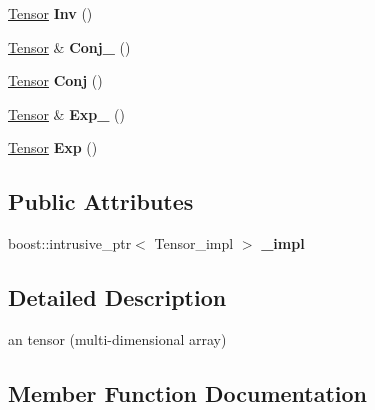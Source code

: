 \begin{DoxyCompactItemize}
\item 
\mbox{\label{classcytnx_1_1Tensor_a7ed6193e29219ff1a2ca2ca95b8b5969}} 
\hyperlink{classcytnx_1_1Tensor}{Tensor} {\bfseries Inv} ()
\item 
\mbox{\label{classcytnx_1_1Tensor_a9312d8faf3fdc8ffe5a7687f88986a1e}} 
\hyperlink{classcytnx_1_1Tensor}{Tensor} \& {\bfseries Conj\+\_\+} ()
\item 
\mbox{\label{classcytnx_1_1Tensor_acf65f5c4d143eb165f7161e58a06b7e4}} 
\hyperlink{classcytnx_1_1Tensor}{Tensor} {\bfseries Conj} ()
\item 
\mbox{\label{classcytnx_1_1Tensor_a4ebfd2713960db958ddb23c4e06c17c4}} 
\hyperlink{classcytnx_1_1Tensor}{Tensor} \& {\bfseries Exp\+\_\+} ()
\item 
\mbox{\label{classcytnx_1_1Tensor_aca1b7e9ae53b3529a7f79b24991c9373}} 
\hyperlink{classcytnx_1_1Tensor}{Tensor} {\bfseries Exp} ()
\end{DoxyCompactItemize}
\subsection*{Public Attributes}
\begin{DoxyCompactItemize}
\item 
\mbox{\label{classcytnx_1_1Tensor_a8ce244b54f83542eb4c66e2d6f0e7d86}} 
boost\+::intrusive\+\_\+ptr$<$ Tensor\+\_\+impl $>$ {\bfseries \+\_\+impl}
\end{DoxyCompactItemize}


\subsection{Detailed Description}
an tensor (multi-\/dimensional array) 

\subsection{Member Function Documentation}
\mbox{\label{classcytnx_1_1Tensor_a5e2248e9babdb786167ed349df9084ae}} 

